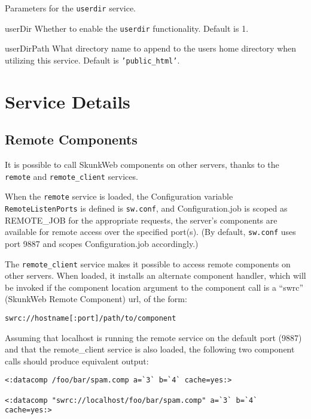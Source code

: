 \documentclass[titlepage]{manual}
\begin{document}
Parameters for the \texttt{userdir} service.
\begin{argdesc}
\item[userDir] Whether to enable the \texttt{userdir} functionality.  Default
is 1.
\item[userDirPath] What directory name to append to the users home directory
when utilizing this service.  Default is \texttt{'public_html'}.
\end{argdesc}

\chapter{Service Details}

\section{Remote Components}
\label{remotecomponents}
It is possible to call SkunkWeb components on other servers, thanks to 
the \texttt{remote} and \texttt{remote_client} services.  

When the 
\texttt{remote} service is loaded, the Configuration variable 
\texttt{RemoteListenPorts} is defined is \texttt{sw.conf}, and 
Configuration.job is scoped as REMOTE_JOB for the appropriate requests, 
the server's components are available for remote access over the specified
port(s).  (By default, \texttt{sw.conf} uses port 9887 and scopes 
Configuration.job accordingly.)  

The \texttt{remote_client} service makes it possible to access
remote components on other servers.  When loaded, it installs an alternate
component handler, which will be invoked if the component location argument 
to the component call is a ``swrc'' (SkunkWeb Remote Component) url, 
of the form:

\begin{verbatim}
swrc://hostname[:port]/path/to/component
\end{verbatim}

Assuming that localhost is running the remote service on the default port 
(9887) and that the remote_client service is also loaded, the following 
two component calls should produce equivalent output:

\begin{verbatim}
<:datacomp /foo/bar/spam.comp a=`3` b=`4` cache=yes:>

<:datacomp "swrc://localhost/foo/bar/spam.comp" a=`3` b=`4` cache=yes:>
\end{verbatim}
\end{document}
